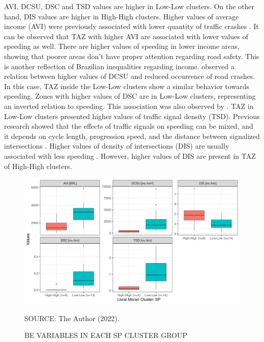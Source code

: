 AVI, DCSU, DSC and TSD values are higher in Low-Low clusters. On the other hand, DIS values are higher in High-High clusters. Higher values of average income (AVI) were previously associated with lower quantity of traffic crashes \cite{Obelheiro2019, Marshall2017}. It can be observed that TAZ with higher AVI are associated with lower values of speeding as well. There are higher values of speeding in lower income areas, showing that poorer areas don't have proper attention regarding road safety. This is another reflection of Brazilian inequalities regarding income. \textcite{Ouyang2014,Welle2016} observed a relation between higher values of DCSU and reduced occurrence of road crashes. In this case, TAZ inside the Low-Low clusters show a similar behavior towards speeding. Zones with higher values of DSC are in Low-Low clusters, representing an inverted relation to speeding. This association was also observed by \textcite{Li2013a, Oliveira2015}. TAZ in Low-Low clusters presented higher values of traffic signal density (TSD). Previous research showed that the effects of traffic signals on speeding can be mixed, and it depends on cycle length, progression speed, and the distance between signalized intersections \cite{Elvik2009, Furth2018}. Higher values of density of intersections (DIS) are usually associated with less speeding \cite{Dumbaugh2009, Huang2018, Obelheiro2020}. However, higher values of DIS are present in TAZ of High-High clusters.

\begin{figure}[!htbp]
    \footnotesize
    \captionsetup{font=footnotesize}
    \caption{BE VARIABLES IN EACH SP CLUSTER GROUP}
    \centering
    \includegraphics{fig/wilcox_hist.png}
    \label{fig:wilcox_sp}
    \par SOURCE: The Author (2022).
\end{figure}

